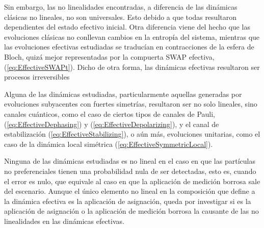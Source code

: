  Sin embargo, las no linealidades encontradas, a diferencia de las dinámicas clásicas no lineales, no son universales. Esto debido a que todas resultaron dependientes del estado efectivo inicial.  
%
Otra diferencia viene del hecho que las evoluciones clásicas  no conllevan cambios en la entropía del sistema, mientras que las evoluciones efectivas estudiadas se traducían en contracciones de la esfera de Bloch, quizá mejor representadas por la compuerta SWAP efectiva, (\ref{eq:EffectiveSWAPt}). Dicho de otra forma, las dinámicas efectivas resultaron ser procesos irreversibles 

Alguna de las dinámicas estudiadas, particularmente aquellas generadas por evoluciones subyacentes con fuertes simetrías, resultaron ser no solo lineales, sino canales cuánticos, como el caso de ciertos tipos de canales de Pauli, (\ref{eq:EffectiveDephasing}) y (\ref{eq:EffectiveDepolarizing}), y el canal de estabilización (\ref{eq:EffectiveStabilizing}), o aún más, evoluciones unitarias, como el caso de la dinámica local simétrica (\ref{eq:EffectiveSymmetricLocal}). 

Ninguna de las dinámicas estudiadas es no lineal en el caso en que las partículas no preferenciales tienen una probabilidad nula de ser detectadas, esto es, cuando el error es nulo, que equivale al caso en que la aplicación de medición borrosa sale del escenario. Aunque el único elemento no lineal en la composición que define a la dinámica efectiva es la aplicación de asignación, queda por investigar si es la aplicación de asignación o la aplicación de medición borrosa la causante de las no linealidades en las dinámicas efectivas.
